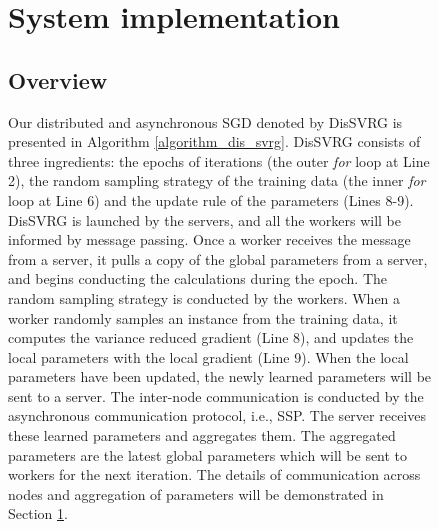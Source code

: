 \documentclass[preprint,review,11pt,a4paper]{elsarticle}
\begin{document}
\begin{figure}
%
%
%
%


\section{System implementation}
\label{implementation}
\subsection{Overview}
Our distributed and asynchronous SGD denoted by DisSVRG is presented  in Algorithm \ref{algorithm_dis_svrg}. DisSVRG consists of three ingredients: the epochs of iterations (the outer \emph{for} loop at Line 2), the random sampling strategy of the training data (the inner \emph{for} loop at Line 6) and the update rule of the parameters (Lines 8-9). DisSVRG is launched by the servers, and all the workers will be informed by message passing. Once a worker receives the message from a server, it pulls a copy of the global parameters from a server, and  begins conducting the calculations during the epoch. The random sampling strategy is conducted by the workers. When a worker randomly samples an instance from the training data, it computes the variance reduced gradient (Line 8), and updates the local parameters with the local gradient (Line 9). When the local parameters have been updated, the newly learned parameters will be sent to a server. The inter-node communication is conducted by the asynchronous communication protocol, i.e., SSP. The server receives these learned parameters  and aggregates them. The aggregated parameters are the latest global parameters which will be sent to workers for the next iteration. The details of communication across nodes and aggregation of parameters will be demonstrated in Section \ref{implementation}.


\end{figure}
\end{document}
